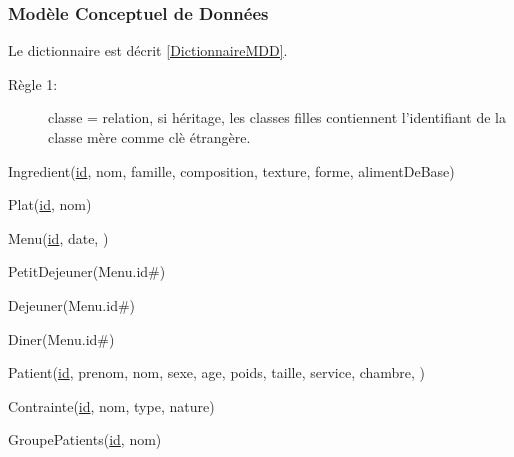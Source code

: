 \subsubsection{Modèle Conceptuel de Données}
Le dictionnaire est décrit \autoref{DictionnaireMDD}.
\begin{description}
\item[Règle 1:] classe = relation, si héritage, les classes filles contiennent l'identifiant de la classe mère comme clè étrangère.
\end{description}

Ingredient(\underline{id}, nom, famille, composition, texture, forme, alimentDeBase)

Plat(\underline{id}, nom)

Menu(\underline{id}, date, )

PetitDejeuner(Menu.id\#)

Dejeuner(Menu.id\#)

Diner(Menu.id\#)

Patient(\underline{id}, prenom, nom, sexe, age, poids, taille, service, chambre, )

Contrainte(\underline{id}, nom, type, nature)

GroupePatients(\underline{id}, nom)






